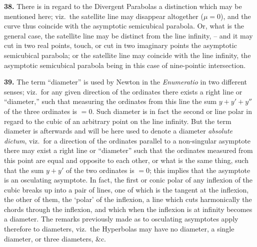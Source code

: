 \documentclass[11pt,a4paper]{article}
\begin{document}
\medskip

\textbf{38.} There is in regard to the Divergent Parabolas a distinction which may be mentioned here; viz.\ the satellite line may disappear altogether ($\mu = 0$), and the curve thus coincide with the asymptotic semicubical parabola. Or, what is the general case, the satellite line may be distinct from the line infinity, -- and it may cut in two real points, touch, or cut in two imaginary points the asymptotic semicubical parabola; or the satellite line may coincide with the line infinity, the asymptotic semicubical parabola being in this case of nine-pointic intersection.

\medskip

\textbf{39.} The term ``diameter'' is used by Newton in the \emph{Enumeratio} in two different senses; viz.\ for any given direction of the ordinates there exists a right line or ``diameter,'' such that measuring the ordinates from this line the sum $y + y' + y''$ of the three ordinates is $=0$. Such diameter is in fact the second or line polar in regard to the cubic of an arbitrary point on the line infinity. But the term diameter is afterwards and will be here used to denote a diameter \emph{absolute dictum}, viz.\ for a direction of the ordinates parallel to a non-singular asymptote there may exist a right line or ``diameter'' such that the ordinates measured from this point are equal and opposite to each other, or what is the same thing, such that the sum $y + y'$ of the two ordinates is $=0$; this implies that the asymptote is an osculating asymptote. In fact, the first or conic polar of any inflexion of the cubic breaks up into a pair of lines, one of which is the tangent at the inflexion, the other of them, the `polar' of the inflexion, a line which cuts harmonically the chords through the inflexion, and which when the inflexion is at infinity becomes a diameter. The remarks previously made as to osculating asymptotes apply therefore to diameters, viz.\ the Hyperbolas may have no diameter, a single diameter, or three diameters, \&c.

\medskip
\end{document}
